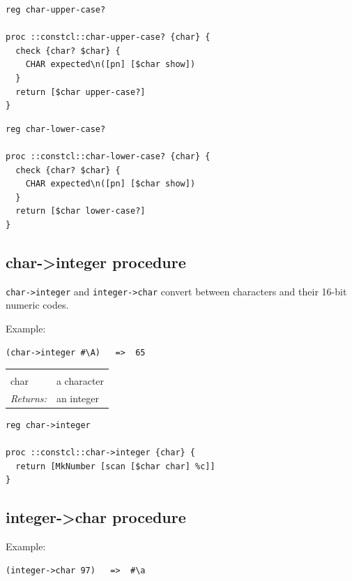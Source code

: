 \documentclass[twoside]{report}
\begin{document}
\begin{lstlisting}
reg char-upper-case?

proc ::constcl::char-upper-case? {char} {
  check {char? $char} {
    CHAR expected\n([pn] [$char show])
  }
  return [$char upper-case?]
}
\end{lstlisting}

\begin{lstlisting}
reg char-lower-case?

proc ::constcl::char-lower-case? {char} {
  check {char? $char} {
    CHAR expected\n([pn] [$char show])
  }
  return [$char lower-case?]
}
\end{lstlisting}

\subsection{char->integer procedure}
\label{charinteger-procedure}

\texttt{char->integer} and \texttt{integer->char} convert between characters and their 16-bit numeric codes.

Example:

\begin{verbatim}
(char->integer #\A)   =>  65
\end{verbatim}

\noindent\begin{tabular}{ |p{1.9cm} p{8cm}| }
\hline
\rowcolor[HTML]{CCCCCC} \multicolumn{2}{|l|}{\bf char->integer (public)} \\
char & a character \\
\textit{Returns:} & an integer \\
\hline
\end{tabular}

\begin{lstlisting}
reg char->integer

proc ::constcl::char->integer {char} {
  return [MkNumber [scan [$char char] %c]]
}
\end{lstlisting}

\subsection{integer->char procedure}
\label{integerchar-procedure}

Example:

\begin{verbatim}
(integer->char 97)   =>  #\a
\end{verbatim}
\end{document}

